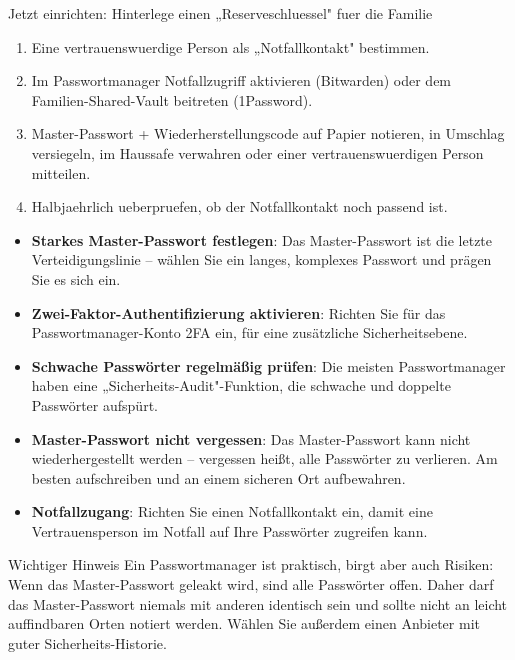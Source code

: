 \begin{tcbpractice}{Jetzt einrichten: Hinterlege einen „Reserveschluessel" fuer die Familie}
\begin{enumerate}
  \item Eine vertrauenswuerdige Person als „Notfallkontakt" bestimmen.
  \item Im Passwortmanager Notfallzugriff aktivieren (Bitwarden) oder dem Familien-Shared-Vault beitreten (1Password).
  \item Master-Passwort + Wiederherstellungscode auf Papier notieren, in Umschlag versiegeln, im Haussafe verwahren oder einer vertrauenswuerdigen Person mitteilen.
  \item Halbjaehrlich ueberpruefen, ob der Notfallkontakt noch passend ist.
\end{enumerate}

\end{tcbpractice}


\begin{itemize}
  \item \textbf{Starkes Master-Passwort festlegen}: Das Master-Passwort ist die letzte Verteidigungslinie – wählen Sie ein langes, komplexes Passwort und prägen Sie es sich ein.
  \item \textbf{Zwei-Faktor-Authentifizierung aktivieren}: Richten Sie für das Passwortmanager-Konto 2FA ein, für eine zusätzliche Sicherheitsebene.
  \item \textbf{Schwache Passwörter regelmäßig prüfen}: Die meisten Passwortmanager haben eine „Sicherheits-Audit"-Funktion, die schwache und doppelte Passwörter aufspürt.
  \item \textbf{Master-Passwort nicht vergessen}: Das Master-Passwort kann nicht wiederhergestellt werden – vergessen heißt, alle Passwörter zu verlieren. Am besten aufschreiben und an einem sicheren Ort aufbewahren.
  \item \textbf{Notfallzugang}: Richten Sie einen Notfallkontakt ein, damit eine Vertrauensperson im Notfall auf Ihre Passwörter zugreifen kann.
\end{itemize}

\begin{tcbwarn}{Wichtiger Hinweis}
Ein Passwortmanager ist praktisch, birgt aber auch Risiken: Wenn das Master-Passwort geleakt wird, sind alle Passwörter offen. Daher darf das Master-Passwort niemals mit anderen identisch sein und sollte nicht an leicht auffindbaren Orten notiert werden. Wählen Sie außerdem einen Anbieter mit guter Sicherheits-Historie.

\end{tcbwarn}

